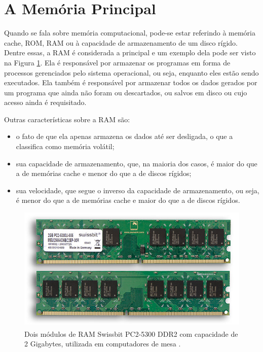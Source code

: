 \section{A Memória Principal}

Quando se fala sobre memória computacional, pode-se estar referindo à memória 
cache, \acrfull{ROM}, \acrfull{RAM} ou à capacidade de armazenamento de um disco rígido. 
Dentre essas, a \acrshort{RAM} é considerada a principal e um exemplo dela 
pode ser visto na Figura \ref{fig:ram}. Ela é responsável por 
armazenar os programas em forma de processos gerenciados pelo sistema operacional, ou seja, 
enquanto eles estão sendo executados. Ela também é responsável por armazenar todos os dados 
gerados por um programa que ainda não foram ou descartados, ou salvos em disco ou cujo acesso 
ainda é requisitado.

Outras características sobre a \acrshort{RAM} são: 
\begin{itemize}
    \item o fato de que ela apenas armazena os dados até ser desligada, o que a classifica 
    como memória volátil;
    \item sua capacidade de armazenamento, que, na maioria dos casos, é maior do que a de memórias 
          cache e menor do que a de discos rígidos;
    \item sua velocidade, que segue o inverso da capacidade de armazenamento, ou seja, é menor do 
          que a de memórias cache e maior do que a de discos rígidos.
\end{itemize}

\begin{figure}[H]
    \centering
    \includegraphics[scale=1.5]{chapters/chp3/images/Swissbit-2GB-PC2-5300U-555.jpg}
    \caption{Dois módulos de \acrshort{RAM} Swissbit\textsuperscript{\textregistered} 
    PC2-5300 DDR2 com capacidade de 2 Gigabytes, utilizada em computadores de mesa \cite{wiki:ddr2_ram}.}
    \label{fig:ram}
\end{figure}